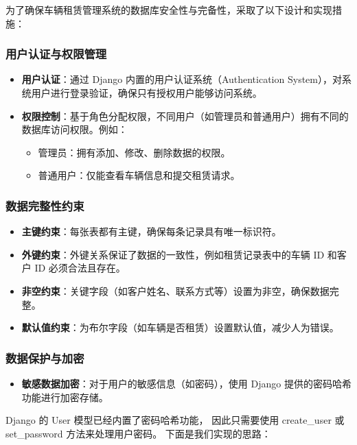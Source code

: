 \documentclass[UTF8,a4paper,12pt]{ctexart}
\begin{document}
为了确保车辆租赁管理系统的数据库安全性与完备性，采取了以下设计和实现措施：

\subsubsection{用户认证与权限管理}
\begin{itemize}
    \item \textbf{用户认证}：通过 Django 内置的用户认证系统（Authentication System），对系统用户进行登录验证，确保只有授权用户能够访问系统。
    \item \textbf{权限控制}：基于角色分配权限，不同用户（如管理员和普通用户）拥有不同的数据库访问权限。例如：
    \begin{itemize}
        \item 管理员：拥有添加、修改、删除数据的权限。
        \item 普通用户：仅能查看车辆信息和提交租赁请求。
    \end{itemize}
\end{itemize}

\subsubsection{数据完整性约束}
\begin{itemize}
    \item \textbf{主键约束}：每张表都有主键，确保每条记录具有唯一标识符。
    \item \textbf{外键约束}：外键关系保证了数据的一致性，例如租赁记录表中的车辆 ID 和客户 ID 必须合法且存在。
    \item \textbf{非空约束}：关键字段（如客户姓名、联系方式等）设置为非空，确保数据完整。
    \item \textbf{默认值约束}：为布尔字段（如车辆是否租赁）设置默认值，减少人为错误。
\end{itemize}

\subsubsection{数据保护与加密}
\begin{itemize}
    \item \textbf{敏感数据加密}：对于用户的敏感信息（如密码），使用 Django 提供的密码哈希功能进行加密存储。
\end{itemize}

Django 的 User 模型已经内置了密码哈希功能，
因此只需要使用 create\_user 或 set\_password 方法来处理用户密码。
下面是我们实现的思路：
\end{document}
